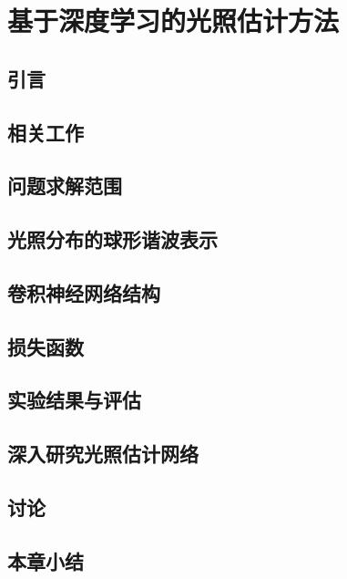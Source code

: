 \chapter{基于深度学习的光照估计方法}\label{chap:illumination-estimation}
\section{引言}
\section{相关工作}
\section{问题求解范围}
\section{光照分布的球形谐波表示}
\section{卷积神经网络结构}
\section{损失函数}
\section{实验结果与评估}
\section{深入研究光照估计网络}
\section{讨论}
\section{本章小结}
